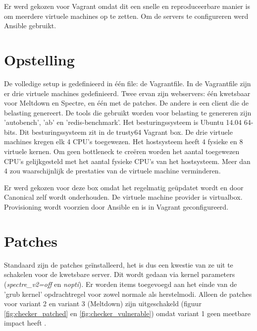 Er werd gekozen voor Vagrant omdat dit een snelle en reproduceerbare manier is om meerdere virtuele machines op te zetten. Om de servers te configureren werd Ansible gebruikt.

\section{Opstelling}
De volledige setup is gedefinieerd in één file: de Vagrantfile.
In de Vagrantfile zijn er drie virtuele machines gedefinieerd. Twee ervan zijn webservers: één kwetsbaar voor Meltdown en Spectre, en één met de patches. De andere is een client die de belasting genereert. De tools die gebruikt worden voor belasting te genereren zijn 'autobench', 'ab' en 'redis-benchmark'. Het besturingssysteem is Ubuntu 14.04 64-bits. Dit besturingssysteem zit in de trusty64 Vagrant box. De drie virtuele machines kregen elk 4 CPU's toegewezen. Het hostsysteem heeft 4 fysieke en 8 virtuele kernen. Om geen bottleneck te creëren worden het aantal toegewezen CPU's gelijkgesteld met het aantal fysieke CPU's van het hostsysteem. Meer dan 4 zou waarschijnlijk de prestaties van de virtuele machine verminderen.

Er werd gekozen voor deze box omdat het regelmatig geüpdatet wordt en door Canonical zelf wordt onderhouden.
De virtuele machine provider is virtualbox. Provisioning wordt voorzien door Ansible en is in Vagrant geconfigureerd.

\section{Patches}
Standaard zijn de patches geïnstalleerd, het is dus een kwestie van ze uit te schakelen voor de kwetsbare server.
Dit wordt gedaan via kernel parameters (\textit{spectre\_v2=off} en \textit{nopti}). Er worden items toegevoegd aan het einde van de 'grub kernel' opdrachtregel voor zowel normale als herstelmodi.
Alleen de patches voor variant 2 en variant 3 (Meltdown) zijn uitgeschakeld (figuur \ref{fig:checker_patched} en \ref{fig:checker_vulnerable}) omdat variant 1 geen meetbare impact heeft \parencite{Redhat2018a}.